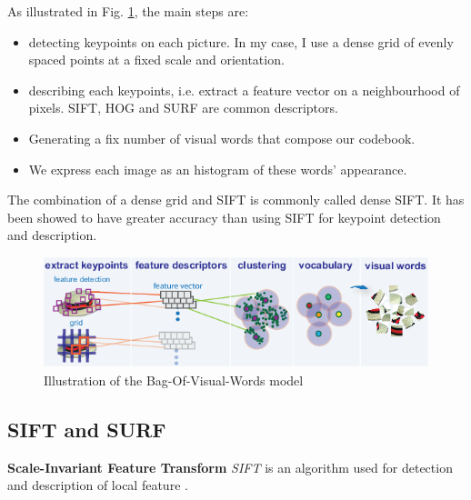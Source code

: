 As illustrated in Fig. \ref{fig:bow_process}, the main steps are:
\begin{itemize}
    \item detecting keypoints on each picture. In my case, I use a dense grid of evenly spaced points at a fixed scale and orientation.
    \item describing each keypoints, i.e. extract a feature vector on a neighbourhood of pixels. SIFT, HOG and SURF are common descriptors.
    \item Generating a fix number of visual words that compose our codebook.
    \item We express each image as an histogram of these words' appearance.
\end{itemize}

The combination of a dense grid and SIFT is commonly called dense SIFT. It has been showed to have greater accuracy than using SIFT for keypoint detection and description.

\begin{figure}
    \centering
    \includegraphics[scale=0.9]{img/bow.png}
    \caption{Illustration of the Bag-Of-Visual-Words model}
    \label{fig:bow_process}
\end{figure}

\subsection{SIFT and SURF}

\textbf{Scale-Invariant Feature Transform} \textit{SIFT} is an algorithm used for detection and description of local feature \cite{Lowe2004}.

